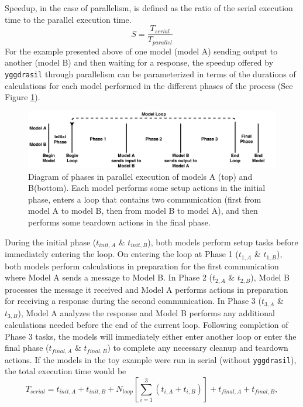 \documentclass[journal]{IEEEtran}
\newcommand{\pkg}{{\tt yggdrasil}{}}
\begin{document}
Speedup, in the case of parallelism, is defined as the ratio of the serial execution time to the parallel execution time.
%
\begin{equation}
S = \frac{T_{serial}}{T_{parallel}}
\end{equation}
%
For the example presented above of one model (model A) sending output to another (model B) and then waiting for a response, the speedup offered by {\pkg} through parallelism can be parameterized in terms of the durations of calculations for each model performed in the different phases of the process (See Figure \ref{fig:empty_parallel}). 
%
\ifinclfig
 	\begin{figure}[htbp]
	\begin{center}
	\includegraphics[width=\columnwidth,keepaspectratio]{./images/Parallelism-Empty.png}
	\caption{Diagram of phases in parallel execution of models A (top) and B(bottom). Each model performs some setup actions in the initial phase, enters a loop that contains two communication (first from model A to model B, then from model B to model A), and then performs some teardown actions in the final phase.}
	\label{fig:empty_parallel}
	\end{center}
	\end{figure}
\fi
%
During the initial phase ($t_{init,A}$ \& $t_{init,B}$), both models perform setup tasks before immediately entering the loop. On entering the loop at Phase 1 ($t_{1,A}$ \& $t_{1,B}$), both models perform calculations in preparation for the first communication where Model A sends a message to Model B. In Phase 2 ($t_{2,A}$ \& $t_{2,B}$), Model B processes the message it received and Model A performs actions in preparation for receiving a response during the second communication. In Phase 3 ($t_{3,A}$ \& $t_{3,B}$), Model A analyzes the response and Model B performs any additional calculations needed before the end of the current loop. Following completion of Phase 3 tasks, the models will immediately either enter another loop or enter the final phase ($t_{final,A}$ \& $t_{final,B}$) to complete any necessary cleanup and teardown actions. 
%
If the models in the toy example were run in serial (without {\pkg}), the total execution time would be 
%
\begin{equation}
T_{serial} = t_{init,A} + t_{init,B} + N_{loop}\left[\sum_{i=1}^{3}\left(t_{i,A} + t_{i,B}\right)\right] + t_{final, A} + t_{final, B},
\end{equation}
\end{document}
